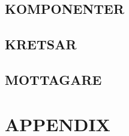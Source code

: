 \documentclass[a4paper,twoside,twocolumn,openright]{book}
\begin{document}
\chapter{KOMPONENTER}

\cleardoublepage

\cleardoublepage

\cleardoublepage

\cleardoublepage

\cleardoublepage

\cleardoublepage

\cleardoublepage

\cleardoublepage


\chapter{KRETSAR}

\cleardoublepage

\cleardoublepage

\cleardoublepage

\cleardoublepage

\cleardoublepage

\cleardoublepage

\cleardoublepage

\cleardoublepage


\chapter{MOTTAGARE}

\cleardoublepage

\cleardoublepage

\cleardoublepage

\cleardoublepage

\cleardoublepage

\cleardoublepage

\cleardoublepage

\cleardoublepage















\appendix
\part{APPENDIX}













\listoffigures
\listoftables

\backmatter

\printindex
\end{document}
